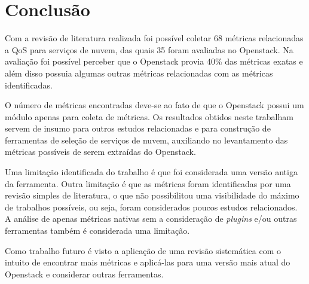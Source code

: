 \documentclass[conference]{IEEEtran}
\begin{document}
\section{Conclusão}
Com a revisão de literatura realizada foi possível coletar 68 métricas relacionadas a QoS para serviços de nuvem, das quais
35 foram avaliadas no Openstack. Na avaliação foi possível perceber que o Openstack provia 40\% das métricas exatas e além disso
possuia algumas outras métricas relacionadas com as métricas identificadas. 

O número de métricas encontradas deve-se ao fato de que o Openstack possui um módulo apenas para coleta de métricas. 
Os resultados obtidos neste trabalham servem de insumo para outros estudos relacionadas e para construção de ferramentas de seleção de 
serviços de nuvem, auxiliando no levantamento das métricas possíveis de serem extraídas do Openstack.

Uma limitação identificada do trabalho é que foi considerada uma versão antiga da ferramenta. Outra limitação é que as métricas
foram identificadas por uma revisão simples de literatura, o que não possibilitou uma visibilidade do máximo de trabalhos possíveis,
ou seja, foram considerados poucos estudos relacionados. A análise de apenas métricas nativas sem a consideração de \textit{plugins} e/ou
outras ferramentas também é considerada uma limitação.

Como trabalho futuro é visto a aplicação de uma revisão sistemática com o intuito de encontrar mais métricas e aplicá-las para
uma versão mais atual do Openstack e considerar outras ferramentas.






% 
% 
\end{document}
